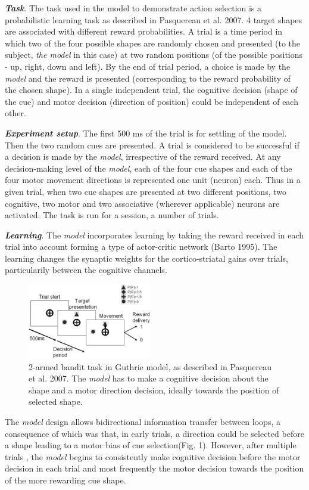 \documentclass[11pt]{article}
\begin{document}
\textbf{\emph{Task}}. The task used in the model to demonstrate action selection is a probabilistic learning task as described in Pasquereau et al. 2007. 4 target shapes are associated with different reward probabilities.
A trial is a time period in which two of the four possible shapes are randomly chosen and presented (to the subject, \emph{the model} in this case) at two random positions (of the possible positions - up, right, down and left). By the end of trial period, a choice is made by the \emph{model} and the reward is presented (corresponding to the reward probability of the chosen shape). In a single independent trial, the cognitive decision (shape of the cue) and motor decision (direction of position) could be independent of each other.  
\par
\textbf{\emph{Experiment setup}}. The first 500 ms of the trial is for settling of the model. Then the two random cues are presented. A trial is considered to be successful if a decision is made by the \emph{model}, irrespective of the reward received. At any decision-making level of the \emph{model}, each of the four cue shapes and each of the four motor movement directions is represented one unit (neuron) each. Thus in a given trial, when two cue shapes are presented at two different positions, two cognitive, two motor and two associative (wherever applicable) neurons are activated.  The task is run for a session, a number of trials.
\par
\textbf{\emph{Learning}}. The \emph{model} incorporates learning by taking the reward received in each trial into account forming a type of actor-critic network (Barto 1995). The learning changes the synaptic weights for the cortico-striatal gains over trials, particularily between the cognitive channels. 
\begin{figure}\vspace*{-1\baselineskip}%
  \begin{center}
  \includegraphics[width=0.48\textwidth]{two-armed.jpg}
  \end{center}
  \caption[2-armed bandit task in Guthrie model]{2-armed bandit task in Guthrie model, as described in Pasquereau et al. 2007. The \emph{model} has to make a cognitive decision about the shape and a motor direction decision, ideally towards the position of selected shape.}
\end{figure} The \emph{model} design allows bidirectional information transfer between loops, a consequence of which was that, in early trials, a direction could be selected before a shape leading to a motor bias of cue selection(Fig. 1). However, after multiple trials , the \emph{model} begins to consistently make cognitive decision before the motor decision in each trial and most frequently the motor decision towards the position of the more rewarding cue shape.\par
\end{document}
